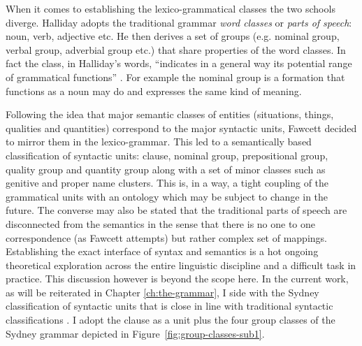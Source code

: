 When it comes to establishing the lexico-grammatical classes the two schools diverge. Halliday adopts the traditional grammar \textit{word classes} or \textit{parts of speech}: noun, verb, adjective etc. He then derives a set of groups (e.g. nominal group, verbal group, adverbial group etc.) that share properties of the word classes. In fact the class, in Halliday's words, ``indicates in a general way its potential range of grammatical functions'' \citep[76]{Halliday2013}. For example the nominal group is a formation that functions as a noun may do and expresses the same kind of meaning. 

Following the idea that major semantic classes of entities (situations, things, qualities and quantities) correspond to the major syntactic units, Fawcett decided to mirror them in the lexico-grammar. This led to a semantically based classification of syntactic units: clause, nominal group, prepositional group, quality group and quantity group \citep[193--194]{Fawcett2000} along with a set of minor classes such as genitive and proper name clusters. This is, in a way, a tight coupling of the grammatical units with an ontology which may be subject to change in the future. The converse may also be stated that the traditional parts of speech are disconnected from the semantics in the sense that there is no one to one correspondence (as Fawcett attempts) but rather complex set of mappings. Establishing the exact interface of syntax and semantics is a hot ongoing theoretical exploration across the entire linguistic discipline and a difficult task in practice. This discussion however is beyond the scope here.   
In the current work, as will be reiterated in Chapter \ref{ch:the-grammar}, I side with the Sydney classification of syntactic units that is close in line with traditional syntactic classifications \citep{Quirk1985}. I adopt the clause as a unit plus the four group classes of the Sydney grammar depicted in \mbox{Figure \ref{fig:group-classes-sub1}}. 

